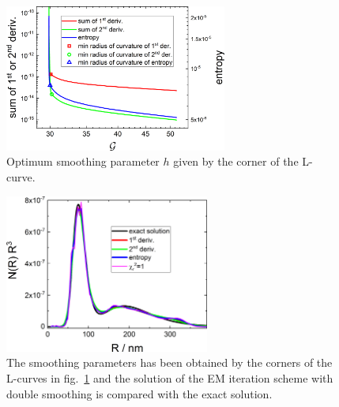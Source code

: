 \begin{figure}[htb]
\centering
\includegraphics[width=0.65\textwidth]{../images/form_factor/EM/EMsmoothLcurves.png}
\caption{Optimum smoothing parameter $h$ given by the corner of the L-curve.\label{fig:EMhLcurve}}
\end{figure}

\begin{figure}[htb]
\centering
\includegraphics[width=0.6\textwidth]{../images/form_factor/EM/EMsmoothNRR3.png}
\caption{The smoothing parameters has been obtained by the corners of the L-curves in fig.\ \ref{fig:EMhLcurve} and the solution of the EM iteration scheme with double smoothing is compared with the exact solution.\label{fig:EMsmoothNRR3}}
\end{figure}

